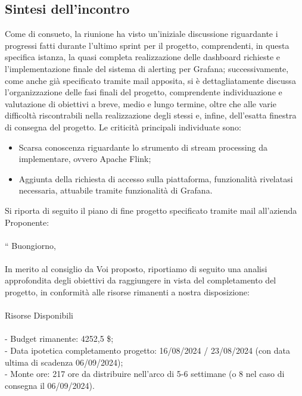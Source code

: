 \documentclass[8pt]{article}
\begin{document}
\subsection{Sintesi dell'incontro}
Come di consueto, la riunione ha visto un'iniziale discussione riguardante i progressi 
fatti durante l'ultimo sprint per il progetto, comprendenti, in questa specifica istanza, la quasi completa realizzazione
delle dashboard richieste e l'implementazione finale del sistema di alerting per Grafana; successivamente, come
anche già specificato tramite mail apposita, si è dettagliatamente discussa l'organizzazione delle fasi
finali del progetto, comprendente individuazione e valutazione di obiettivi a breve, medio e lungo termine, oltre che
alle varie difficoltà riscontrabili nella realizzazione degli  stessi e, infine, dell'esatta finestra di consegna
del progetto.
Le criticità principali individuate sono:
\begin {itemize}
    \item Scarsa conoscenza riguardante lo strumento di stream processing da implementare, ovvero Apache Flink;
    \item Aggiunta della richiesta di accesso sulla piattaforma, funzionalità rivelatasi necessaria, attuabile tramite funzionalità di Grafana.
\end {itemize}   
Si riporta di seguito il piano di fine progetto specificato tramite mail all'azienda Proponente:\\\\
``
Buongiorno,\\\\
In merito al consiglio da Voi proposto, riportiamo di seguito una analisi approfondita degli obiettivi da raggiungere in vista del completamento del progetto, in conformità alle risorse rimanenti a nostra disposizione:\\\\

Risorse Disponibili\\\\
- Budget rimanente: 4252,5 \$;\\

- Data ipotetica completamento progetto: 16/08/2024 / 23/08/2024 (con data ultima di scadenza 06/09/2024);\\

- Monte ore: 217 ore da distribuire nell'arco di 5-6 settimane (o 8 nel caso di consegna il 06/09/2024).\\\\
\end{document}
